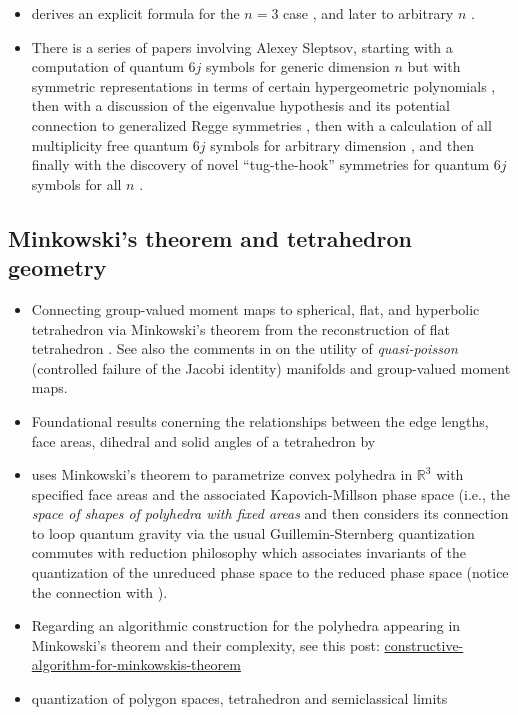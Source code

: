 \documentclass[notitlepage, 10pt]{article}
\begin{document}
\begin{itemize}
    \item \citeauthor{artamonov2023classical} derives an explicit formula for the $n=3$ case \cite{artamonov2023classical}, and later to arbitrary $n$ \cite{artamonov2024calculation}.
    \item There is a series of papers involving Alexey Sleptsov, starting with a computation of quantum $6j$ symbols for generic dimension $n$ but with symmetric representations in terms of certain hypergeometric polynomials \cite{mironov2017sixj}, then with a discussion of the eigenvalue hypothesis and its potential connection to generalized Regge symmetries \cite{morozov2018new}, then with a calculation of all multiplicity free quantum $6j$ symbols for arbitrary dimension \cite{alekseev2020multiplicity}, and then finally with the discovery of novel ``tug-the-hook'' symmetries for quantum $6j$ symbols for all $n$ \cite{lanina2023tug}.
\end{itemize}

\subsection{Minkowski's theorem and tetrahedron geometry}
\begin{itemize}
    \item Connecting group-valued moment maps to spherical, flat, and hyperbolic tetrahedron via Minkowski's theorem from the reconstruction of flat tetrahedron \citeauthor{haggard2016encoding}. See also the comments in \cite[Section 11]{haggard2016encoding} on the utility of \textit{quasi-poisson} (controlled failure of the Jacobi identity) manifolds and group-valued moment maps.
    \item Foundational results conerning the relationships between the edge lengths, face areas, dihedral and solid angles of a tetrahedron by \citeauthor{richardson1902trigonometry} \cite{richardson1902trigonometry}
    \item \citeauthor{bianchi2011polyhedra} uses Minkowski's theorem to parametrize convex polyhedra in $\mathbb R^{3}$ with specified face areas and the associated Kapovich-Millson phase space (i.e., the \textit{space of shapes of polyhedra with fixed areas} and then considers its connection to loop quantum gravity via the usual Guillemin-Sternberg quantization commutes with reduction philosophy which associates invariants of the quantization of the unreduced phase space to the reduced phase space \cite{bianchi2011polyhedra} (notice the connection with \cite{haggard2016encoding}).
    \item Regarding an algorithmic construction for the polyhedra appearing in Minkowski's theorem and their complexity, see this post: 
        \href{https://math.stackexchange.com/questions/105033/constructive-algorithm-for-minkowskis-theorem}{constructive-algorithm-for-minkowskis-theorem}
    \item \citeauthor{charles2010quantization} quantization of polygon spaces, tetrahedron and semiclassical limits \cite{charles2010quantization}
\end{itemize}
\end{document}
